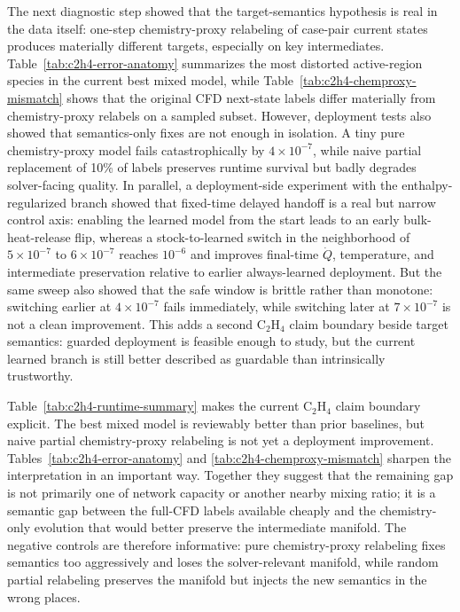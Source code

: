 \documentclass[11pt]{article}
\begin{document}
The next diagnostic step showed that the target-semantics hypothesis is real in the data itself: one-step chemistry-proxy relabeling of case-pair current states produces materially different targets, especially on key intermediates. Table~\ref{tab:c2h4-error-anatomy} summarizes the most distorted active-region species in the current best mixed model, while Table~\ref{tab:c2h4-chemproxy-mismatch} shows that the original CFD next-state labels differ materially from chemistry-proxy relabels on a sampled subset. However, deployment tests also showed that semantics-only fixes are not enough in isolation. A tiny pure chemistry-proxy model fails catastrophically by $4\times10^{-7}$, while naive partial replacement of 10\% of labels preserves runtime survival but badly degrades solver-facing quality. In parallel, a deployment-side experiment with the enthalpy-regularized branch showed that fixed-time delayed handoff is a real but narrow control axis: enabling the learned model from the start leads to an early bulk-heat-release flip, whereas a stock-to-learned switch in the neighborhood of $5\times10^{-7}$ to $6\times10^{-7}$ reaches $10^{-6}$ and improves final-time $\dot{Q}$, temperature, and intermediate preservation relative to earlier always-learned deployment. But the same sweep also showed that the safe window is brittle rather than monotone: switching earlier at $4\times10^{-7}$ fails immediately, while switching later at $7\times10^{-7}$ is not a clean improvement. This adds a second C$_2$H$_4$ claim boundary beside target semantics: guarded deployment is feasible enough to study, but the current learned branch is still better described as guardable than intrinsically trustworthy.





Table~\ref{tab:c2h4-runtime-summary} makes the current C$_2$H$_4$ claim boundary explicit. The best mixed model is reviewably better than prior baselines, but naive partial chemistry-proxy relabeling is not yet a deployment improvement. Tables~\ref{tab:c2h4-error-anatomy} and \ref{tab:c2h4-chemproxy-mismatch} sharpen the interpretation in an important way. Together they suggest that the remaining gap is not primarily one of network capacity or another nearby mixing ratio; it is a semantic gap between the full-CFD labels available cheaply and the chemistry-only evolution that would better preserve the intermediate manifold. The negative controls are therefore informative: pure chemistry-proxy relabeling fixes semantics too aggressively and loses the solver-relevant manifold, while random partial relabeling preserves the manifold but injects the new semantics in the wrong places.
\end{document}
